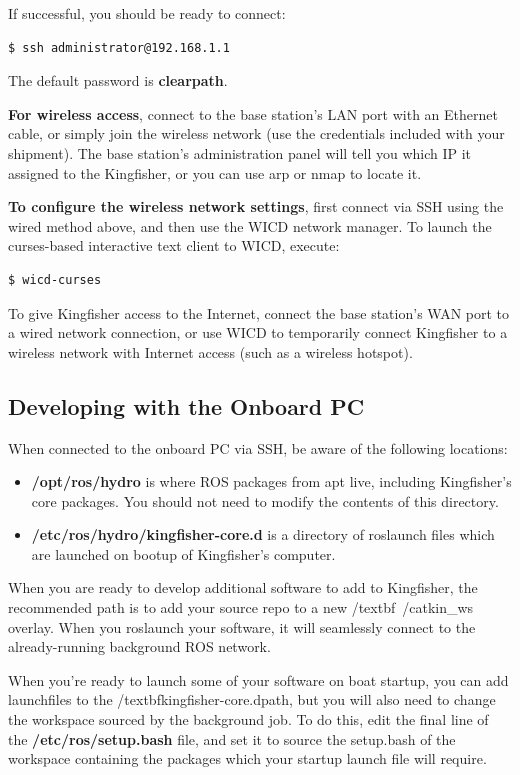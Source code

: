 \documentclass[]{clearpath-latex/clearpath-manual}
\begin{document}
\begin{enumerate}[nolistsep]
\begin{enumerate}[nolistsep]
If successful, you should be ready to connect:

\begin{lstlisting}
$ ssh administrator@192.168.1.1
\end{lstlisting}

The default password is \textbf{clearpath}.

\textbf{For wireless access}, connect to the base station’s LAN port with an Ethernet cable, or simply join the wireless network (use the credentials included with your shipment). The base station’s administration panel will tell you which IP it assigned to the Kingfisher, or you can use arp or nmap to locate it.

\textbf{To configure the wireless network settings}, first connect via SSH using the wired method above, and then use the WICD network manager. To launch the curses-based interactive text client to WICD, execute:

\begin{lstlisting}
$ wicd-curses
\end{lstlisting}

To give Kingfisher access to the Internet, connect the base station’s WAN port to a wired network connection, or use WICD to temporarily connect Kingfisher to a wireless network with Internet access (such as a wireless hotspot).

\subsection{Developing with the Onboard PC}
When connected to the onboard PC via SSH, be aware of the following locations:

\begin{itemize}[nolistsep]
	\item \textbf{/opt/ros/hydro} is where ROS packages from apt live, including Kingfisher’s core packages. You should not need to modify the contents of this directory.
	\item \textbf{/etc/ros/hydro/kingfisher-core.d} is a directory of roslaunch files which are launched on bootup of Kingfisher’s computer.
\end{itemize}

When you are ready to develop additional software to add to Kingfisher, the recommended path is to add your source repo to a new /textbf{~/catkin_ws overlay}. When you roslaunch your software, it will seamlessly connect to the already-running background ROS network.

When you’re ready to launch some of your software on boat startup, you can add launchfiles to the /textbf{kingfisher-core.d}path, but you will also need to change the workspace sourced by the background job. To do this, edit the final line of the \textbf{/etc/ros/setup.bash} file, and set it to source the setup.bash of the workspace containing the packages which your startup launch file will require.


\end{enumerate}
\end{enumerate}
\end{document}
